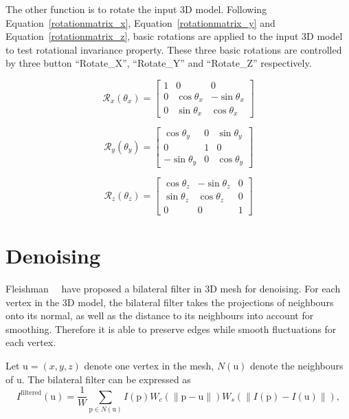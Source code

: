 The other function is to rotate the input 3D model. Following Equation~\ref{rotationmatrix_x}, Equation~\ref{rotationmatrix_y} and Equation~\ref{rotationmatrix_z}, basic rotations are applied to the input 3D model to test rotational invariance property. These three basic rotations are controlled by three button ``Rotate\_X'', ``Rotate\_Y'' and ``Rotate\_Z'' respectively. 

\begin{equation} \label{rotationmatrix_x}
  \mathcal{R}_x(\theta_x)=
  \begin{bmatrix}
    1 & 0 & 0 \\
    0 &  \cos{\theta_x} &  -\sin{\theta_x} \\
    0 &  \sin{\theta_x} & \cos{\theta_x}
  \end{bmatrix}
\end{equation}

\begin{equation} \label{rotationmatrix_y}
  \mathcal{R}_y(\theta_y)=
  \begin{bmatrix}
    \cos{\theta_y} & 0 & \sin{\theta_y} \\
    0 & 1 & 0 \\
     -\sin{\theta_y} & 0 & \cos{\theta_y}
  \end{bmatrix} 
\end{equation}

\begin{equation} \label{rotationmatrix_z}
  \mathcal{R}_z(\theta_z)=
  \begin{bmatrix} 
    \cos{\theta_z} &   -\sin{\theta_z} & 0 \\
    \sin{\theta_z} & \cos{\theta_z} & 0 \\
    0 & 0 & 1 
  \end{bmatrix}
\end{equation}

\section{Denoising}

Fleishman~\etal~\cite{fleishman2003bilateral} have proposed a bilateral filter in 3D mesh for denoising. For each vertex in the 3D model, the bilateral filter takes the projections of neighbours onto its normal, as well as the distance to its neighbours into account for smoothing. Therefore it is able to preserve edges while smooth fluctuations for each vertex. 

Let $\bm{\mathrm{u}}=(x,y,z)$ denote one vertex in the mesh, $N(\bm{\mathrm{u}})$ denote the neighbours of $\bm{\mathrm{u}}$. The bilateral filter can be expressed as
\begin{equation} \label{bilaterialfilter}
I^\text{filtered}(\bm{\mathrm{u}}) = \frac{1}{W} \sum_{\bm{\mathrm{p}} \in N(\bm{\mathrm{u}})} I(\bm{\mathrm{p}})W_c(\|\bm{\mathrm{p}}-\bm{\mathrm{u}}\|)W_s(\|I(\bm{\mathrm{p}})-I(\bm{\mathrm{u}})\|),
\end{equation}

